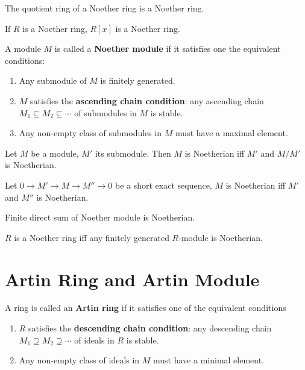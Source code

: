 \documentclass[12pt]{book}
\begin{document}
	\begin{lemma}
		The quotient ring of a Noether ring is a Noether ring.
	\end{lemma}
	
	\begin{theorem}
		If $R$ is a Noether ring, $R[x]$ is a Noether ring.
	\end{theorem}
	
	
	\begin{definition}
		A module $M$ is called a {\bf Noether module} if it satisfies one the equivalent conditions:
		\begin{enumerate}
			\item Any submodule of $M$ is finitely generated.
			\item $M$ satisfies the {\bf ascending chain condition}: any ascending chain $M_1\subseteq M_2\subseteq \cdots$ of submodules in $M$ is stable.
			\item Any non-empty class of submodules in $M$ must have a maximal element.
		\end{enumerate}
	\end{definition}
	
	\begin{lemma}
		Let $M$ be a module, $M'$ its submodule. Then $M$ is Noetherian iff $M'$ and $M/M'$ is Noetherian.
	\end{lemma}
	
	\begin{corollary}
		Let $0\rightarrow M' \rightarrow M\rightarrow M''\rightarrow0$ be a short exact sequence, $M$ is Noetherian iff $M'$ and $M''$ is Noetherian.
	\end{corollary}
	
	\begin{corollary}
		Finite direct sum of Noether module is Noetherian.
	\end{corollary}
	
	\begin{corollary}
		$R$ is a Noether ring iff any finitely generated $R$-module is Noetherian.
	\end{corollary}
	
	\section{Artin Ring and Artin Module}
	
	\begin{definition}
		A ring is called an {\bf Artin ring} if it satisfies one of the equivalent conditions
		\begin{enumerate}
			\item $R$ satisfies the {\bf descending chain condition}: any descending chain $M_1\supseteq M_2\supseteq \cdots$ of ideals in $R$ is stable.
			\item Any non-empty class of ideals in $M$ must have a minimal element.
		\end{enumerate}
	\end{definition}
	
\end{document}
